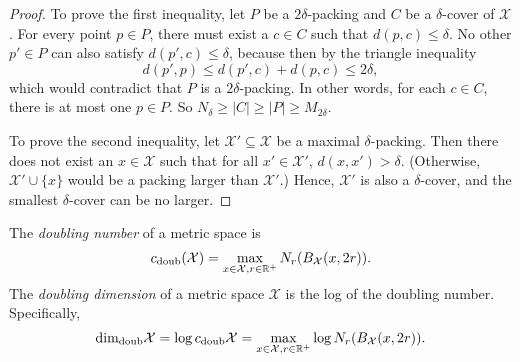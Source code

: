 \documentclass[../main.tex]{subfiles}
\newcommand{\set}[1]{\mathcal {#1}}
\newcommand{\radius}{r}
\newcommand{\dist}[2]{\distf({#1},{#2})}
\newcommand{\distf}{d}
\newcommand{\minkdim}{\text{dim}_\text{Mink}}
\newcommand{\doubdim}{\text{dim}_\text{doub}}
\newcommand{\doubnum}{c_\text{doub}}
\begin{document}
\begin{proof}
    To prove the first inequality, let $P$ be a $2\delta$-packing and $C$ be a $\delta$-cover of $\set X$.
    For every point $p\in P$, there must exist a $c\in C$ such that $\dist{p}{c}\le\delta$.
    No other $p'\in P$ can also satisfy $\dist{p'}{c}\le\delta$, because then by the triangle inequality
    \begin{equation}
        \dist{p'}{p} \le \dist{p'}{c}+\dist{p}{c} \le 2\delta
        ,
    \end{equation}
    which would contradict that $P$ is a $2\delta$-packing.
    In other words, for each $c\in C$, there is at most one $p\in P$.
    So $N_\delta \ge |C| \ge |P| \ge M_{2\delta}$.

    To prove the second inequality, let $\set X'\subseteq \set X$ be a maximal $\delta$-packing.
    Then there does not exist an $x\in\set X$ such that for all $x'\in\set X'$, 
    $\dist{x}{x'} > \delta$.
    (Otherwise, $\set X' \cup \{x\}$ would be a packing larger than $\set X'$.)
    Hence, $\set X'$ is also a $\delta$-cover,
    and the smallest $\delta$-cover can be no larger.
\end{proof}

%

%

\begin{definition}
    The \emph{doubling number} of a metric space is
    \begin{equation}
        \doubnum(\set X) = \max_{x\in\set X, \radius\in\R^+} N_\radius(B_{\set X}(x,2\radius))
        .
    \end{equation}
    The \emph{doubling dimension} of a metric space $\set X$ is the log of the doubling number.
    Specifically,
    \begin{equation}
        \doubdim \set X = \log \doubnum\set X = \max_{x\in\set X, \radius\in\R^+} \log N_\radius(B_{\set X}(x,2\radius))
        .
    \end{equation}
\end{definition}
\cite{gupta2003bounded}
\end{document}
